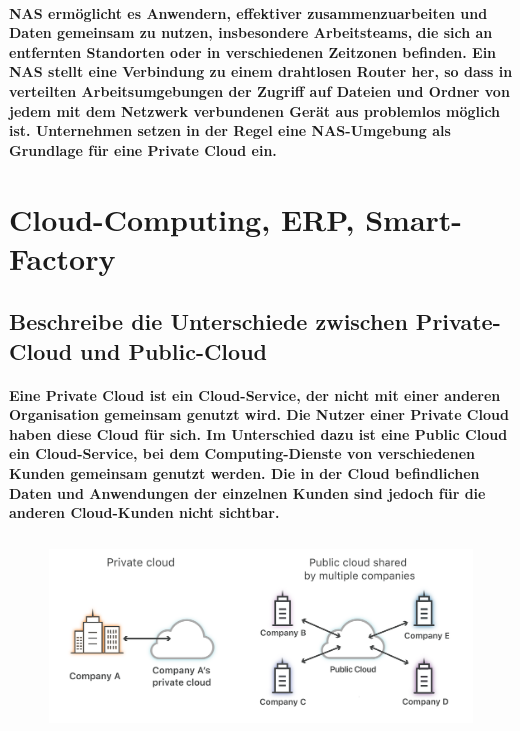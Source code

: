 \documentclass[a4paper]{article}
\begin{document}
    \paragraph{\color{codegreen}NAS ermöglicht es Anwendern, effektiver zusammenzuarbeiten und Daten gemeinsam zu nutzen, insbesondere Arbeitsteams, die sich an entfernten Standorten oder in verschiedenen Zeitzonen befinden. Ein NAS stellt eine Verbindung zu einem drahtlosen Router her, so dass in verteilten Arbeitsumgebungen der Zugriff auf Dateien und Ordner von jedem mit dem Netzwerk verbundenen Gerät aus problemlos möglich ist. Unternehmen setzen in der Regel eine NAS-Umgebung als Grundlage für eine Private Cloud ein.}
    \section{Cloud-Computing, ERP, Smart-Factory}\label{sec:cloud-computing-erp-smart-factory}
    \subsection{\color{red} Beschreibe die Unterschiede zwischen Private-Cloud und Public-Cloud}\label{subsec:beschreibe-die-unterschiede-zwischen-private-cloud-und-public-cloud}
    \paragraph{\color{codegreen}Eine Private Cloud ist ein Cloud-Service, der nicht mit einer anderen Organisation gemeinsam genutzt wird. Die Nutzer einer Private Cloud haben diese Cloud für sich.
    Im Unterschied dazu ist eine Public Cloud ein Cloud-Service, bei dem Computing-Dienste von verschiedenen Kunden gemeinsam genutzt werden. Die in der Cloud befindlichen Daten und Anwendungen der einzelnen Kunden sind jedoch für die anderen Cloud-Kunden nicht sichtbar.}
    \begin{center}
        \begin{figure}[H]
            \centering
            \includegraphics[height=5cm]{media/cloud}\label{fig:cloud}
        \end{figure}
    \end{center}
\end{document}
